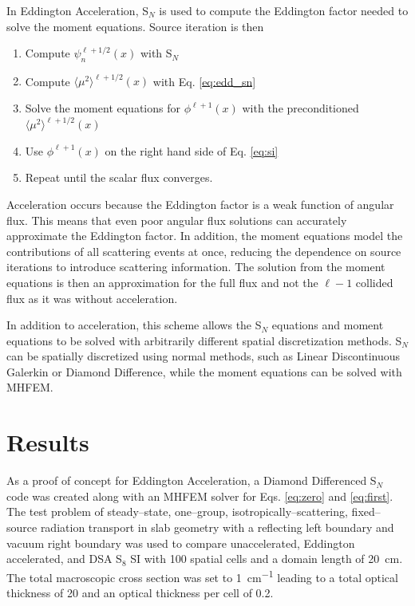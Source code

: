 \documentclass{anstrans}
\newcommand{\SN}{S$_N$\xspace}
\newcommand{\edd}{\langle \mu^2 \rangle}
\begin{document}
	In Eddington Acceleration, \SN is used to compute the Eddington factor needed to solve the moment equations. Source iteration is then 
		\begin{enumerate}
			\item Compute $\psi_n^{\ell+1/2}(x)$ with \SN 
			\item Compute $\edd^{\ell+1/2}(x)$ with Eq. \ref{eq:edd_sn}
			\item Solve the moment equations for $\phi^{\ell+1}(x)$ with the preconditioned $\edd^{\ell+1/2}(x)$ 
			\item Use $\phi^{\ell+1}(x)$ on the right hand side of Eq. \ref{eq:si}
			\item Repeat until the scalar flux converges. 
		\end{enumerate}

	Acceleration occurs because the Eddington factor is a weak function of angular flux. This means that even poor angular flux solutions can accurately approximate the Eddington factor. In addition, the moment equations model the contributions of all scattering events at once, reducing the dependence on source iterations to introduce scattering information. The solution from the moment equations is then an approximation for the full flux and not the $\ell - 1$ collided flux as it was without acceleration. 

	In addition to acceleration, this scheme allows the \SN equations and moment equations to be solved with arbitrarily different spatial discretization methods. \SN can be spatially discretized using normal methods, such as Linear Discontinuous Galerkin or Diamond Difference, while the moment equations can be solved with MHFEM. 

\section{Results}
	As a proof of concept for Eddington Acceleration, a Diamond Differenced \SN code was created along with an MHFEM solver for Eqs. \ref{eq:zero} and \ref{eq:first}. The test problem of steady--state, one--group, isotropically--scattering, fixed--source radiation transport in slab geometry with a reflecting left boundary and vacuum right boundary was used to compare unaccelerated, Eddington accelerated, and DSA S$_8$ SI with 100 spatial cells and a domain length of \SI{20}{cm}. The total macroscopic cross section was set to \SI{1}{cm^{-1}} leading to a total optical thickness of 20 and an optical thickness per cell of 0.2. 
\end{document}
